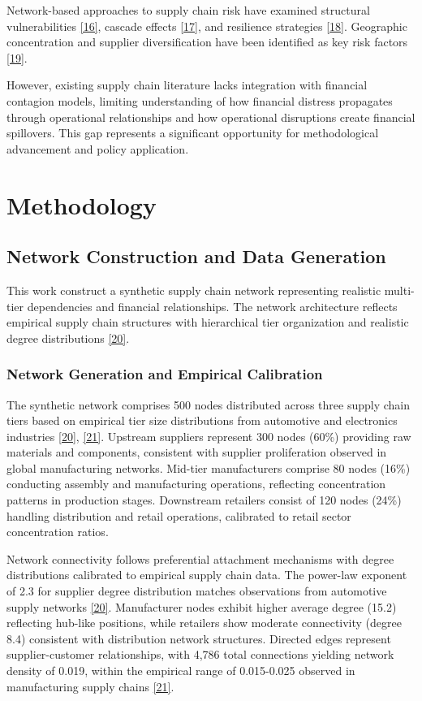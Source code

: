\documentclass[a4 paper, 11pt,twoside]{article}
\newcommand{\0}{\Bf{0}}
\theoremstyle{definition}
\begin{document}
Network-based approaches to supply chain risk have examined structural vulnerabilities \hyperref[ref16]{[16]}, cascade effects \hyperref[ref17]{[17]}, and resilience strategies \hyperref[ref18]{[18]}. Geographic concentration and supplier diversification have been identified as key risk factors \hyperref[ref19]{[19]}.

However, existing supply chain literature lacks integration with financial contagion models, limiting understanding of how financial distress propagates through operational relationships and how operational disruptions create financial spillovers. This gap represents a significant opportunity for methodological advancement and policy application.

\section{Methodology}

\subsection{Network Construction and Data Generation}

This work construct a synthetic supply chain network representing realistic multi-tier dependencies and financial relationships. The network architecture reflects empirical supply chain structures with hierarchical tier organization and realistic degree distributions \hyperref[ref20]{[20]}.

\subsubsection{Network Generation and Empirical Calibration}

The synthetic network comprises 500 nodes distributed across three supply chain tiers based on empirical tier size distributions from automotive and electronics industries \hyperref[ref20]{[20]}, \hyperref[ref21]{[21]}. Upstream suppliers represent 300 nodes (60\%) providing raw materials and components, consistent with supplier proliferation observed in global manufacturing networks. Mid-tier manufacturers comprise 80 nodes (16\%) conducting assembly and manufacturing operations, reflecting concentration patterns in production stages. Downstream retailers consist of 120 nodes (24\%) handling distribution and retail operations, calibrated to retail sector concentration ratios.

Network connectivity follows preferential attachment mechanisms with degree distributions calibrated to empirical supply chain data. The power-law exponent of 2.3 for supplier degree distribution matches observations from automotive supply networks \hyperref[ref20]{[20]}. Manufacturer nodes exhibit higher average degree (15.2) reflecting hub-like positions, while retailers show moderate connectivity (degree 8.4) consistent with distribution network structures. Directed edges represent supplier-customer relationships, with 4,786 total connections yielding network density of 0.019, within the empirical range of 0.015-0.025 observed in manufacturing supply chains \hyperref[ref21]{[21]}.
\end{document}
